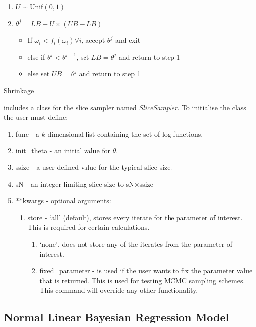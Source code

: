 \documentclass[article]{jss}
\begin{document}
%
\begin{algorithm}[H]
\begin{enumerate}
\item $U\sim\mbox{Unif}(0,1)$ 
\item $\theta^{j}=LB+U{\times}(UB-LB)$

\begin{itemize}
\item If $\omega_{i}<f_{i}(\omega_{i})\forall i$, accept $\theta^{j}$
and exit 
\item else if $\theta^{j}<\theta^{j-1}$, set $LB=\theta^{j}$ and return
to step 1 
\item else set $UB=\theta^{j}$ and return to step 1 
\end{itemize}
\end{enumerate}
\caption{Shrinkage}
\label{alg:shrinkage}
\end{algorithm}


 includes a class for the slice sampler named \emph{SliceSampler.
}To initialise the class the user must define: 
\begin{enumerate}
\item func - a $k$ dimensional list containing the set of log functions. 
\item init\_theta - an initial value for $\theta$. 
\item ssize - a user defined value for the typical slice size. 
\item sN - an integer limiting slice size to sN$\times$ssize 
\item {*}{*}kwargs - optional arguments:

\begin{enumerate}
\item store - `all' (default), stores every iterate for the parameter of
interest. This is required for certain calculations.

\begin{enumerate}
\item `none', does not store any of the iterates from the parameter of interest. 
\item fixed\_parameter - is used if the user wants to fix the
  parameter value that is returned. This is used for testing MCMC
  sampling schemes.  This command will override any other
  functionality.
\end{enumerate}
\end{enumerate}
\end{enumerate}

\subsection{Normal Linear Bayesian Regression Model}
\label{sec: Regression Model}
\end{document}
